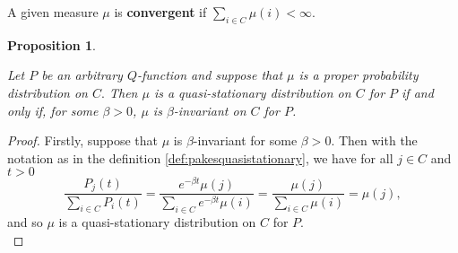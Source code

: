 \documentclass[12pt,a4paper]{scrartcl}
\newtheorem{proposition}[theorem]{Proposition}
\numberwithin{equation}{section}
\begin{document}
A given measure $\mu$ is \textbf{convergent} if $\sum_{i \in C} \mu\left(i\right) < \infty.$

\begin{proposition} \label{quasistationarymuinvariantforp}

Let $P$ be an arbitrary $Q$-function and suppose that $\mu$ is a proper probability distribution on $C.$ Then $\mu$ is a quasi-stationary distribution on $C$ for $P$ if and only if, for some $\beta > 0$, $\mu$ is $\beta$-invariant on $C$ for $P$.
\end{proposition}
\begin{proof}
Firstly, suppose that $\mu$ is $\beta$-invariant for some $\beta > 0.$ Then with the notation as in the definition \ref{def:pakesquasistationary}, we have for all $j \in C$ and $t>0$
$$ \frac{P_j\left(t\right)}{\sum_{i \in C} P_i\left(t\right)} = \frac{e^{-\beta t} \mu\left(j\right)}{\sum_{i \in C} e^{-\beta t}\mu\left(i\right) } = \frac{\mu\left(j\right)}{\sum_{i \in C}\mu\left(i\right) } = \mu\left(j\right), $$ and so $\mu$ is a quasi-stationary distribution on $C$ for $P$. \\[2ex]


\end{proof}
\end{document}
